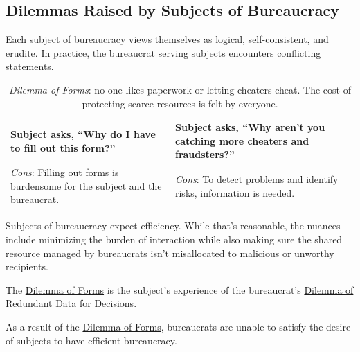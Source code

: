 \subsection*{Dilemmas Raised by Subjects of Bureaucracy\label{sec:subjects-dilemmas}}


Each subject of bureaucracy views themselves as logical, self-consistent, and erudite. In practice, the bureaucrat serving subjects encounters conflicting statements. 

\begin{center}
\begin{table}[H] %
\begin{tabular}{ | m{\dilemmatablewidth}| m{\dilemmatablewidth} | } 
  \hline
  \textbf{Subject asks, ``Why do I have to fill out this form?''} &
  \textbf{Subject asks, ``Why aren't you catching more cheaters and fraudsters?''} \\
  \hline
  \textit{Cons}: Filling out forms is burdensome for the subject and the bureaucrat. & 
  \textit{Cons}: To detect problems and identify risks, information is needed. \\
  \hline
\end{tabular}
\caption{\textit{Dilemma of Forms}: no one likes paperwork or letting cheaters cheat. The cost of protecting scarce resources is felt by everyone.
}
\label{table:dilemma-subject-forms}
\end{table}
\end{center}

Subjects of bureaucracy expect efficiency. While that's reasonable, the nuances include minimizing the burden of interaction while also making sure the shared resource managed by bureaucrats isn't misallocated to malicious or unworthy recipients. 

The 
\hyperref[table:dilemma-subject-forms]{Dilemma of Forms}
is the subject's experience of the bureaucrat's 
\hyperref[table:dilemma-personal-single-bit-decision]{Dilemma of Redundant Data for Decisions}.

%
As a result of the \hyperref[table:dilemma-subject-forms]{Dilemma of Forms}, bureaucrats are unable to satisfy the desire of subjects to have efficient bureaucracy. 

